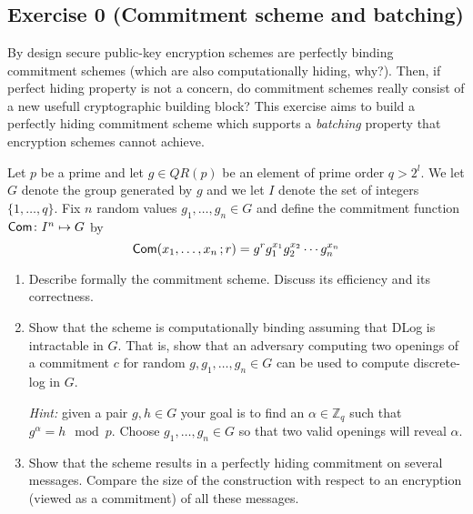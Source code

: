 
\section{}

\subsection{Exercise 0 (Commitment scheme and batching)}

By design secure public-key encryption schemes are perfectly binding commitment schemes (which are also computationally hiding, why?).
Then, if perfect hiding property is not a concern, do commitment schemes really consist of a new usefull cryptographic building block?
This exercise aims to build a perfectly hiding commitment scheme which supports a \emph{batching} property that encryption schemes
cannot achieve.

Let $p$ be a prime and let $g \in QR(p)$ be an element of prime order $q>2^l$.
We let $G$ denote the group generated by $g$ and we let $I$ denote the set of integers $\{1,\dots, q\}$.
Fix $n$ random values $g_1,\dots, g_n \in G$ and define the commitment function $\operatorname{\mathsf{Com}}\colon I^n \mapsto G$ by
\[\operatorname{\mathsf{Com}}(x_1,\dots, x_n\,; r) = g^r g_1^{x_1}g_2^{x_2}\cdots g_n^{x_n}\]
\begin{enumerate}
	\item Describe formally the commitment scheme. Discuss its efficiency and its correctness.
	\item Show that the scheme is computationally binding assuming that DLog is intractable in $G$.
	That is, show that an adversary computing two openings of a commitment $c$ for random
	$g,g_1,\dots, g_n \in G$ can be used to compute discrete-log in $G$.

	\emph{Hint:} given a pair $g, h \in G$ your goal is to find an $\alpha \in \mathbb{Z}_q$ such that $g^\alpha = h \mod p$.
	Choose $g_1,\dots, g_n \in G$ so that two valid openings will reveal $\alpha$.
	\item Show that the scheme results in a perfectly hiding commitment on several messages. Compare the size of the construction
	with respect to an encryption (viewed as a commitment) of all these messages.
\end{enumerate}


